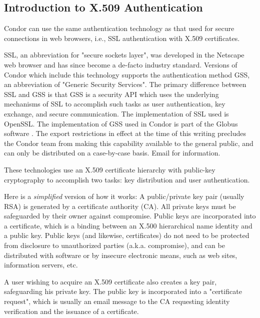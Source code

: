 \subsection{\label{sec:General-X509-Authentication}Introduction to X.509 
Authentication}

Condor can use the same authentication technology as that used for secure
connections in web browsers, i.e., SSL authentication with X.509 certificates.

SSL, an abbreviation for "secure sockets layer", was developed in the 
Netscape web browser and has since become a de-facto industry standard.
Versions of Condor which include this technology supports the authentication
method GSS, an abbreviation of "Generic Security Services". The
primary difference between SSL and GSS is that GSS is a security API which
uses the underlying mechanisms of SSL to accomplish such tasks as user
authentication, key exchange, and secure communication. The implementation
of SSL used is OpenSSL.
The implementation of GSS used in
Condor is part of the Globus software .
The export restrictions in effect at the time of
this writing precludes the Condor team from making this capability available
to the general public, and can only be distributed on a case-by-case basis.
Email  for information.

These technologies use an X.509 certificate hierarchy with public-key 
cryptography to accomplish two tasks: key distribution and user authentication.

Here is a \emph{simplified} version of how it works:
A public/private key pair (usually RSA) is generated by a 
certificate authority (CA).
All private
keys must be safeguarded by their owner against compromise. Public keys are
incorporated into a certificate, which is a binding between an X.500
hierarchical name identity and a public key. Public keys (and likewise,
certificates) do not need to be protected from disclosure to unauthorized
parties (a.k.a. compromise), and can be distributed with software or by
insecure electronic means, such as web sites, information servers, etc.

A user wishing to acquire an X.509 certificate also creates a key pair, 
safeguarding his private key. The public key is incorporated into a 
"certificate request", which is usually an email message to the CA 
requesting identity verification and the issuance of a certificate.

